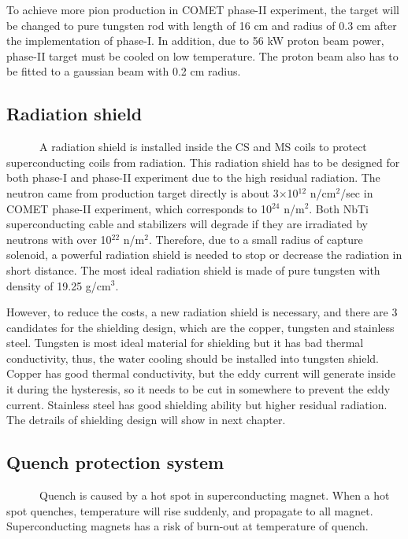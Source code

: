 To achieve more pion production in COMET phase-II experiment, the target will be changed to pure tungsten rod with length of 16 cm and radius of 0.3 cm after the implementation of phase-I.
In addition, due to 56 kW proton beam power, phase-II target must be cooled on low temperature.
The proton beam also has to be fitted to a gaussian beam with 0.2 cm radius.

\subsection{Radiation shield}
~~~~~~A radiation shield is installed inside the CS and MS coils to protect superconducting coils from radiation.
This radiation shield has to be designed for both phase-I and phase-II experiment due to the high residual radiation.
The neutron came from production target directly is about 3$\times$10$^{12}$ n/cm$^2$/sec in COMET phase-II experiment, which corresponds to 10$^{24}$ n/m$^2$.
Both NbTi superconducting cable and stabilizers will degrade if they are irradiated by neutrons with over 10$^{22}$ n/m$^2$.
Therefore, due to a small radius of capture solenoid, a powerful radiation shield is needed to stop or decrease the radiation in short distance.
The most ideal radiation shield is made of pure tungsten with density of 19.25 g/cm$^3$.

However, to reduce the costs, a new radiation shield is necessary, and there are 3 candidates for the shielding design, which are the copper, tungsten and stainless steel.
Tungsten is most ideal material for shielding but it has bad thermal conductivity, thus, the water cooling should be installed into tungsten shield.
Copper has good thermal conductivity, but the eddy current will generate inside it during the hysteresis, so it needs to be cut in somewhere to prevent the eddy current.
Stainless steel has good shielding ability but higher residual radiation.
The detrails of shielding design will show in next chapter.

\subsection{Quench protection system}
~~~~~~Quench is caused by a hot spot in superconducting magnet.
When a hot spot quenches, temperature will rise suddenly, and propagate to all magnet.
Superconducting magnets has a risk of burn-out at temperature of quench.

